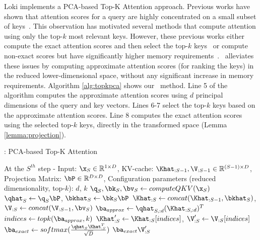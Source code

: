 Loki implements a PCA-based Top-K Attention approach. Previous works have shown
that attention scores for a query are highly concentrated on a small subset of
keys~\citep{xiao2024efficient, sun2024massive}.  This observation has motivated
several methods that compute attention using only the top-$k$ most relevant
keys. However, these previous works either compute the exact attention scores
and then select the top-$k$ keys~\citep{topkattention} or compute non-exact
scores but have significantly higher memory
requirements~\citep{ribar2023sparq}.  \method~alleviates these issues by
computing approximate attention scores (for ranking the keys) in the reduced
lower-dimensional space, without any significant increase in memory
requirements. Algorithm \ref{alg:topkpca} shows our \method~method. Line 5 of
the algorithm computes the approximate attention scores using $d$ principal
dimensions of the query and key vectors. Lines 6-7 select the top-$k$ keys
based on the approximate attention scores. Line 8 computes the exact attention
scores using the selected top-$k$ keys, directly in the transformed space
(Lemma \ref{lemma:projection}).

\begin{algorithm}[h]
  \caption{\method: PCA-based Top-K Attention}
  \label{alg:topkpca}
  \begin{algorithmic}[1]
  \Require At the $S^{th}$ step - Input: $\x_S \in
  \mathbb{R}^{1 \times D}$, KV-cache: $\Khat_{:S-1}, \V_{:S-1} \in \mathbb{R}^{(S - 1)
  \times D}$, Projection Matrix: $\bP \in \mathbb{R}^{D \times D}$, Configuration parameters (reduced dimensionality, top-$k$): $d$, $k$ 
  \State $\q_S, \bk_S, \bv_S \gets computeQKV(\x_S)$ 
  \State $\qhat_S \gets \q_S\bP$, $\bkhat_S \gets \bk_S\bP$ 
  \State $\Khat_{:S} \gets concat(\Khat_{:S-1}, \bkhat_S)$, $\V_{:S} \gets concat(\V_{:S-1}, \bv_S)$ 
  \State $\ba_{approx} \gets \qhat_{S,:d}(\Khat_{:S,:d})^{T}$ 
  \State $indices \gets topk(\ba_{approx}, k)$ 
  \State $\Khat_{:S}^{\prime} \gets \Khat_{:S}[indices]$, $\V_{:S}^{\prime} \gets \V_{:S}[indices]$
  \State $\ba_{exact} \gets softmax(\frac{\qhat_S\Khat_{:S}^{T}}{\sqrt{D}})$ 
  \State \Return $\ba_{exact}\V_{:S}^{\prime}$
  \EndFunction
  \end{algorithmic}
\end{algorithm}

